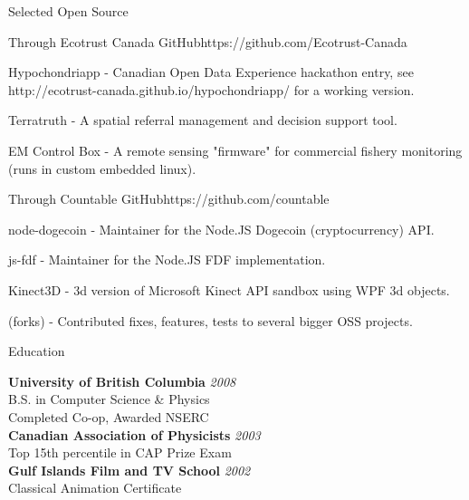 \documentclass{resume} %
\begin{document}
\begin{rSection}{Selected Open Source}

\begin{rSubsection}{Through Ecotrust Canada GitHub}{https://github.com/Ecotrust-Canada}{}{}
\item Hypochondriapp - Canadian Open Data Experience hackathon entry, see \newline
http://ecotrust-canada.github.io/hypochondriapp/ for a working version.
\item Terratruth - A spatial referral management and decision support tool.
\item EM Control Box - A remote sensing "firmware" for commercial fishery monitoring (runs in custom embedded linux).
\end{rSubsection}

\begin{rSubsection}{Through Countable GitHub}{https://github.com/countable}{}{}
\item node-dogecoin - Maintainer for the Node.JS Dogecoin (cryptocurrency) API.
\item js-fdf - Maintainer for the Node.JS FDF implementation.
\item Kinect3D - 3d version of Microsoft Kinect API sandbox using WPF 3d objects.
\item (forks) - Contributed fixes, features, tests to several bigger OSS projects.
\end{rSubsection}


\end{rSection}




\begin{rSection}{Education}

{\bf University of British Columbia} \hfill {\em 2008} \\ 
B.S. in Computer Science \& Physics \\
Completed Co-op, Awarded NSERC \\

{\bf Canadian Association of Physicists} \hfill {\em 2003} \\ 
Top 15th percentile in CAP Prize Exam \\

{\bf Gulf Islands Film and TV School} \hfill {\em 2002} \\ 
Classical Animation Certificate \\

\end{rSection}
\end{document}
